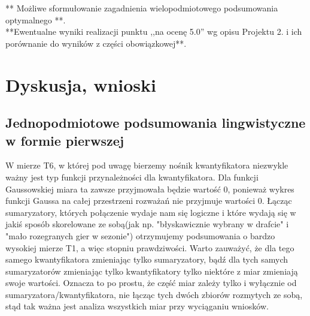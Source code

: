 \documentclass{classrep}
\begin{document}
** Możliwe sformułowanie zagadnienia wielopodmiotowego podsumowania optymalnego **.\\

{**Ewentualne wyniki realizacji punktu ,,na ocenę 5.0'' wg opisu Projektu 2. i ich porównanie do wyników z
części obowiązkowej**.}\\



\section{Dyskusja, wnioski}
\subsection{Jednopodmiotowe podsumowania lingwistyczne w formie pierwszej}

W mierze T6, w której pod uwagę bierzemy nośnik kwantyfikatora niezwykle ważny jest typ funkcji przynależności dla kwantyfikatora. Dla funkcji Gaussowskiej miara ta zawsze przyjmowała będzie wartość 0, ponieważ wykres funkcji Gaussa na całej przestrzeni rozważań nie przyjmuje wartości 0. Łącząc sumaryzatory, których połączenie wydaje nam się logiczne i które wydają się w jakiś sposób skorelowane ze sobą(jak np. "błyskawicznie wybrany w drafcie" i "mało rozegranych gier w sezonie") otrzymujemy podsumowania o bardzo wysokiej mierze T1, a więc stopniu prawdziwości. Warto zauważyć, że dla tego samego kwantyfikatora zmieniając tylko sumaryzatory, bądź dla tych samych sumaryzatorów zmieniając tylko kwantyfikatory tylko niektóre z miar zmieniają swoje wartości. Oznacza to po prostu, że część miar zależy tylko i wyłącznie od sumaryzatora/kwantyfikatora, nie łącząc tych dwóch zbiorów rozmytych ze sobą, stąd tak ważna jest analiza wszystkich miar przy wyciąganiu wniosków.
\end{document}
